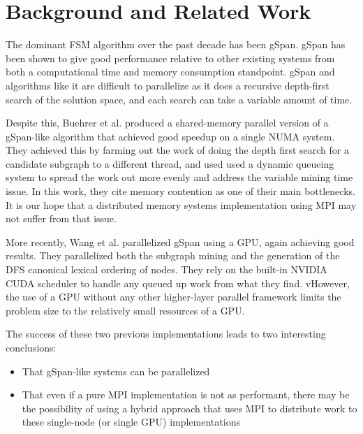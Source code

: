 \section{Background and Related Work}
\label{sec:background}

The dominant FSM algorithm over the past decade has been gSpan\cite{gspan}. 
gSpan has been shown to give good performance relative to other existing
systems from both a computational time and memory consumption standpoint.
gSpan and algorithms like it are difficult to parallelize as it does a 
recursive depth-first search of the solution space, and each search
can take a variable amount of time.   

Despite this, Buehrer et al. produced a shared-memory
parallel version of a gSpan-like algorithm that achieved good speedup on a 
single NUMA system\cite{buehrer2005parallel}.  They achieved this by 
farming out the work of doing the depth first search for a candidate 
subgraph to a different thread, and used used a dynamic queueing 
system to spread the work out more evenly and address the variable
mining time issue.  In this work, they cite 
memory contention as one of their main bottlenecks. It is our hope that
a distributed memory systems implementation using MPI may not suffer
from that issue.  

More recently, Wang et al. parallelized gSpan using a 
GPU\cite{gspancuda}, again achieving good results.  They parallelized both
the subgraph mining and the generation of the DFS canonical lexical 
ordering of nodes.  They rely on the built-in NVIDIA CUDA scheduler to handle
any queued up work from what they find. vHowever, the use of a 
GPU without any other higher-layer parallel framework limits the problem
size to the relatively small resources of a GPU. 

The success of these two previous implementations leads to two interesting
conclusions:
\begin{itemize}
	\item{That gSpan-like systems can be parallelized}
	\item{That even if a pure MPI implementation is not as performant, 
		there may be the possibility of using a hybrid approach
		that uses MPI to distribute work to these single-node 
		(or single GPU) implementations}
\end{itemize}

